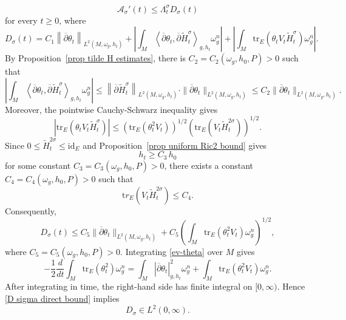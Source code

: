 \documentclass[12pt, reqno]{amsart}
\newcommand\cA{{\mathcal A}}
\newcommand\bp{{\bar\partial}}
\theoremstyle{plain}
\theoremstyle{definition}
\renewcommand{\bar}{\overline}
\newcommand{\beq}{\begin{equation}}
\newcommand{\eeq}{\end{equation}}
\renewcommand{\tilde}{\widetilde}
\renewcommand{\bp}{\bar{\partial}}
\renewcommand{\>}{\rightarrow}
\newcommand{\LL}{\left\langle}
\newcommand{\RL}{\right\rangle}
\renewcommand{\>}{\rightarrow}
\renewcommand{\bp}{{\bar{\partial}}}
\newcommand{\om}{\omega}
\renewcommand{\bar}{\overline}
\renewcommand{\tilde}{\widetilde}
\newcommand{\tr}{\mathrm{tr}}
\numberwithin{equation}{section} %
\begin{document}
\beq
\cA_\sigma'(t)\leq \Lambda_t^\sigma D_\sigma(t)
\label{cA derivative inequality direct proof}
\eeq
for every $t\geq 0$, where
\beq
D_\sigma(t)=
C_1\left\|\bp\theta_t\right\|_{L^2(M,\omega_g, h_t)}
+\left|
\int_M
\LL\bp\theta_t,\bp\tilde H_t^\sigma\RL_{g,h_t}\om_g^n
\right|
+
\left|
\int_M
\tr_E\left(\theta_tV_t\tilde H_t^\sigma\right)\om_g^n
\right| .
\eeq
By Proposition~\ref{prop tilde H estimates}, there is
$C_2=C_2(\om_g,h_0,P)>0$ such that
\beq
\left|\int_M\LL\bp\theta_t,\bp\tilde H_t^\sigma\RL_{g,h_t}\om_g^n\right|
\leq  \left\| \bp\tilde H_t^\sigma \right\|_{L^{2}(M,\omega_g, h_t)}\cdot  \|\bp\theta_t\|_{L^2(M,\omega_g, h_t)}\leq   C_2\|\bp\theta_t\|_{L^2(M,\omega_g, h_t)}.
\eeq
Moreover, the pointwise Cauchy-Schwarz inequality gives
\beq
\left|\tr_E(\theta_tV_t\tilde H_t^\sigma)\right|
\leq
\left(\tr_E(\theta_t^2V_t)\right)^{1/2}
\left(\tr_E(V_t\tilde H_t^{2\sigma})\right)^{1/2}.
\eeq
Since $0 \le \widetilde{H}_t^{2\sigma} \le \mathrm{id}_E$ and
Proposition~\ref{prop uniform Ric2 bound} gives $$h_t \ge C_3\,h_0$$
for some constant $C_3 = C_3(\omega_g, h_0, P) > 0$,
there exists a constant $C_4 = C_4(\omega_g, h_0, P) > 0$ such that
\beq \mathrm tr_E\left(V_t \widetilde{H}_t^{2\sigma}\right) \leq
C_4 .
\eeq
Consequently,
\beq
D_\sigma(t)
\leq C_5\|\bp\theta_t\|_{L^2(M,\omega_g, h_t)}
+C_5\left(\int_M\tr_E(\theta_t^2V_t)\om_g^n\right)^{1/2},
\label{D sigma direct bound}
\eeq
where $C_5=C_5(\om_g,h_0,P)>0$.
Integrating \eqref{ev-theta} over $M$ gives
\beq
-\frac12\frac{d}{dt}\int_M\tr_E(\theta_t^2)\om_g^n
=
\int_M|\bp\theta_t|_{g,h_t}^2\om_g^n
+
\int_M\tr_E(\theta_t^2V_t)\om_g^n.
\eeq
After integrating in time, the right-hand side has finite integral on
$[0,\infty)$. Hence \eqref{D sigma direct bound} implies
\beq
D_\sigma\in L^2(0,\infty).
\label{D sigma L2 direct}
\eeq
\end{document}
